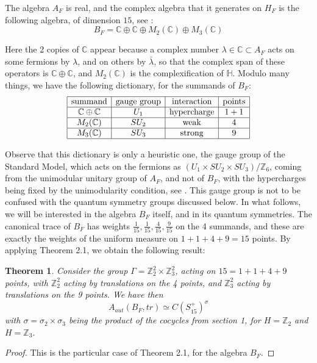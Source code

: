 \documentclass[11pt]{amsart}
\newtheorem{theorem}{Theorem}[section]
\theoremstyle{definition}
\begin{document}
The algebra $A_F$ is real, and the complex algebra that it generates on $H_F$ is the following algebra, of dimension $15$, see \cite{bdd}:
$$B_F=\mathbb C\oplus\mathbb C\oplus M_2(\mathbb C)\oplus M_3(\mathbb C)$$

Here the 2 copies of $\mathbb C$ appear because a complex number $\lambda\in\mathbb C\subset A_F$ acts on some fermions by $\lambda$, and on others by $\bar{\lambda}$, so that the complex span of these operators is $\mathbb C\oplus\mathbb C$, and $M_2(\mathbb C)$ is the complexification of $\mathbb H$. Modulo many things, we have the following dictionary, for the summands of $B_F$:
$$\begin{array}{|c|c|c|c|}
\hline
\text{summand}&\text{gauge group}&\text{interaction}&\text{points}\\
\hline
\mathbb C\oplus\mathbb C&U_1&\text{hypercharge}&1+1\\
\hline
M_2(\mathbb C)&SU_2&\text{weak}&4\\
\hline
M_3(\mathbb C)&SU_3&\text{strong}&9\\
\hline
\end{array}$$

Observe that this dictionary is only a heuristic one, the gauge group of the Standard Model, which acts on the fermions as $(U_1\times SU_2\times SU_3)/\mathbb Z_6$, coming from the unimodular unitary group of $A_F$, and not of $B_F$, with the hypercharges being fixed by the unimodularity condition, see \cite{ccm,vsu}. This gauge group is not to be confused with the quantum symmetry groups discussed below. In what follows, we will be interested in the algebra $B_F$ itself, and in its quantum symmetries. The canonical trace of $B_F$ has weights $\frac{1}{15},\frac{1}{15},\frac{4}{15},\frac{9}{15}$ on the 4 summands, and these are exactly the weights of the uniform measure on $1+1+4+9=15$ points. By applying Theorem 2.1, we obtain the following result:

\begin{theorem}
Consider the group $\Gamma=\mathbb Z_2^2\times\mathbb Z_3^2$, acting on $15=1+1+4+9$ points, with $\mathbb Z_2^2$ acting by translations on the 4 points, and $\mathbb Z_3^2$ acting by translations on the 9 points. We have then
$$A_{aut}(B_F,tr)\simeq C(S_{15}^+)^\sigma$$
with $\sigma=\sigma_2\times\sigma_3$ being the product of the cocycles from section 1, for $H=\mathbb Z_2$ and $H=\mathbb Z_3$.
\end{theorem}

\begin{proof}
This is the particular case of Theorem 2.1, for the algebra $B_F$.
\end{proof}
\end{document}
